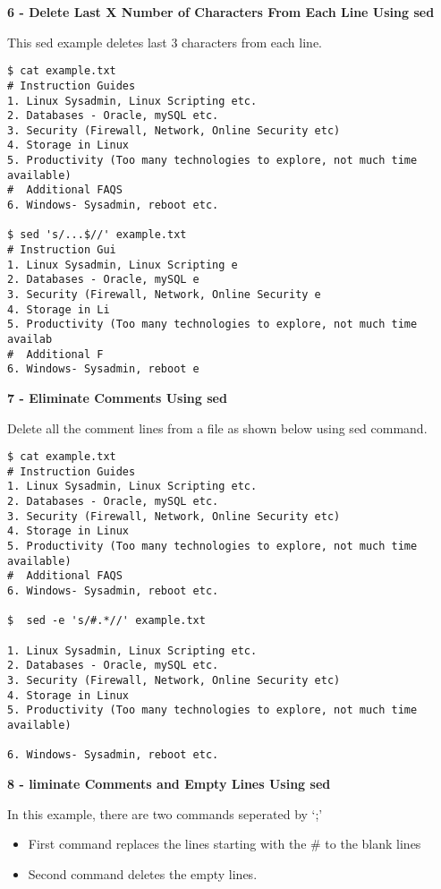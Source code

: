\documentclass[a4paper,11pt,spanish]{article} %
\newenvironment{myscriptlisting}
{\begin{list}{}{\setlength{\leftmargin}{1em}}\item\scriptsize\bfseries}
{\end{list}}
\begin{document}
\textbf{6 - Delete Last X Number of Characters From Each Line Using sed}

This sed example deletes last 3 characters from each line.

\begin{myscriptlisting}
 \begin{verbatim}
$ cat example.txt
# Instruction Guides
1. Linux Sysadmin, Linux Scripting etc.
2. Databases - Oracle, mySQL etc.
3. Security (Firewall, Network, Online Security etc)
4. Storage in Linux
5. Productivity (Too many technologies to explore, not much time available)
#  Additional FAQS
6. Windows- Sysadmin, reboot etc.
 
$ sed 's/...$//' example.txt
# Instruction Gui
1. Linux Sysadmin, Linux Scripting e
2. Databases - Oracle, mySQL e
3. Security (Firewall, Network, Online Security e
4. Storage in Li
5. Productivity (Too many technologies to explore, not much time availab
#  Additional F
6. Windows- Sysadmin, reboot e
 \end{verbatim}
\end{myscriptlisting}

\textbf{7 - Eliminate Comments Using sed}

Delete all the comment lines from a file as shown below using sed command.

\begin{myscriptlisting}
 \begin{verbatim}
$ cat example.txt
# Instruction Guides
1. Linux Sysadmin, Linux Scripting etc.
2. Databases - Oracle, mySQL etc.
3. Security (Firewall, Network, Online Security etc)
4. Storage in Linux
5. Productivity (Too many technologies to explore, not much time available)
#  Additional FAQS
6. Windows- Sysadmin, reboot etc. 
 
$  sed -e 's/#.*//' example.txt

1. Linux Sysadmin, Linux Scripting etc.
2. Databases - Oracle, mySQL etc.
3. Security (Firewall, Network, Online Security etc)
4. Storage in Linux
5. Productivity (Too many technologies to explore, not much time available)

6. Windows- Sysadmin, reboot etc.
 \end{verbatim}
\end{myscriptlisting}

\textbf{8 - liminate Comments and Empty Lines Using sed}

In this example, there are two commands seperated by ‘;’

\begin{itemize}
 \item First command replaces the lines starting with the \# to the blank lines
 \item Second command deletes the empty lines.
\end{itemize}
\end{document}
